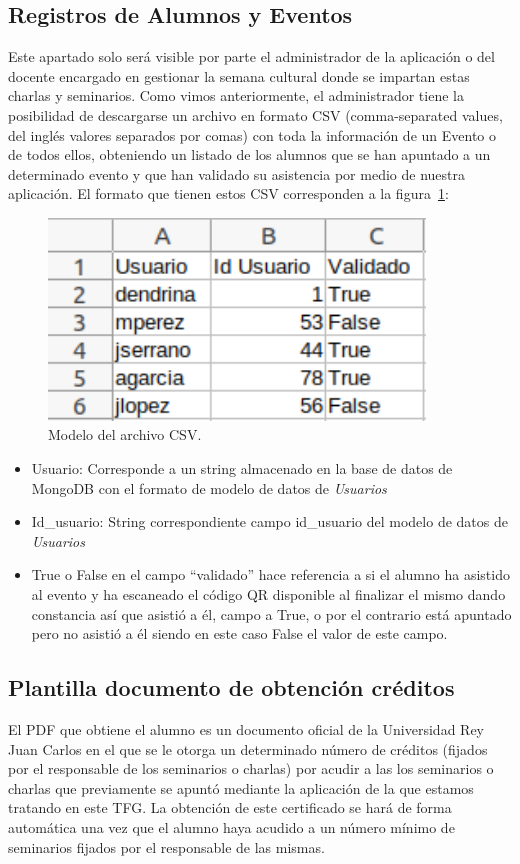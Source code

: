 \documentclass[a4paper, 12pt]{book}
\begin{document}
\subsection{Registros de Alumnos y Eventos}
	Este apartado solo será visible por parte el administrador de la aplicación o del docente encargado en gestionar la semana cultural donde se impartan estas charlas y seminarios. Como vimos anteriormente, el administrador tiene la posibilidad de descargarse un archivo en formato CSV (comma-separated values, del inglés valores separados por comas) con toda la información de un Evento o de todos ellos, obteniendo un listado de los alumnos que se han apuntado a un determinado evento y que han validado su asistencia por medio de nuestra aplicación.
	El formato que tienen estos CSV corresponden a la figura~\ref{fig:CSVAlumnos}:
	\begin{figure}[h!]
  	\centering
  	\includegraphics[width=10cm, keepaspectratio]{img/CSVAlumnos.png}
  	\caption{Modelo del archivo CSV.}\label{fig:CSVAlumnos}
	\end{figure}
	\begin{itemize}
		\item Usuario: Corresponde a un string almacenado en la base de datos de MongoDB con el formato de modelo de datos de \textit{Usuarios}
		\item Id\_usuario: String correspondiente campo id\_usuario del modelo de datos de \textit{Usuarios}
		\item True o False en el campo ``validado'' hace referencia a si el alumno ha asistido al evento y ha escaneado el código QR disponible al finalizar el mismo dando constancia así que asistió a él, campo a True, o por el contrario está apuntado pero no asistió a él siendo en este caso False el valor de este campo.
	\end{itemize}
	

\subsection{Plantilla documento de obtención créditos}
	El PDF que obtiene el alumno es un documento oficial de la Universidad Rey Juan Carlos en el que se le otorga un determinado número de créditos (fijados por el responsable de los seminarios o charlas) por acudir a las los seminarios o charlas que previamente se apuntó mediante la aplicación de la que estamos tratando en este TFG. La obtención de este certificado se hará de forma automática una vez que el alumno haya acudido a un número mínimo de seminarios fijados por el responsable de las mismas. 
\end{document}
